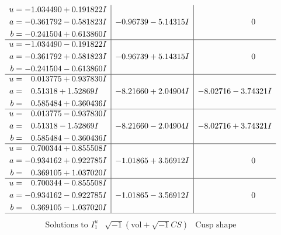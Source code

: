 \documentclass[1p]{elsarticle_modified}
\theoremstyle{definition}
\newcommand{\I}{\sqrt{-1}}
\begin{document}
$$\begin{array}{c|c|c}
\begin{aligned}
u &= -1.034490 + 0.191822 I \\
a &= -0.361792 - 0.581823 I \\
b &= -0.241504 + 0.613860 I\end{aligned}
 & -0.96739 - 5.14315 I & \phantom{-0.000000 } 0 \\ \hline\begin{aligned}
u &= -1.034490 - 0.191822 I \\
a &= -0.361792 + 0.581823 I \\
b &= -0.241504 - 0.613860 I\end{aligned}
 & -0.96739 + 5.14315 I & \phantom{-0.000000 } 0 \\ \hline\begin{aligned}
u &= \phantom{-}0.013775 + 0.937830 I \\
a &= \phantom{-}0.51318 + 1.52869 I \\
b &= \phantom{-}0.585484 + 0.360436 I\end{aligned}
 & -8.21660 + 2.04904 I & -8.02716 - 3.74321 I \\ \hline\begin{aligned}
u &= \phantom{-}0.013775 - 0.937830 I \\
a &= \phantom{-}0.51318 - 1.52869 I \\
b &= \phantom{-}0.585484 - 0.360436 I\end{aligned}
 & -8.21660 - 2.04904 I & -8.02716 + 3.74321 I \\ \hline\begin{aligned}
u &= \phantom{-}0.700344 + 0.855508 I \\
a &= -0.934162 + 0.922785 I \\
b &= \phantom{-}0.369105 + 1.037020 I\end{aligned}
 & -1.01865 + 3.56912 I & \phantom{-0.000000 } 0 \\ \hline\begin{aligned}
u &= \phantom{-}0.700344 - 0.855508 I \\
a &= -0.934162 - 0.922785 I \\
b &= \phantom{-}0.369105 - 1.037020 I\end{aligned}
 & -1.01865 - 3.56912 I & \phantom{-0.000000 } 0\\
 \hline 
 \end{array}$$\newpage$$\begin{array}{c|c|c}  
\text{Solutions to }I^u_{1}& \I (\text{vol} + \sqrt{-1}CS) & \text{Cusp shape}\\
 \hline 
\begin{aligned}

\end{aligned}
\end{array}$$
\end{document}

